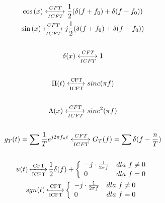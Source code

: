 \begin{multicols}{2}
        \begin{gather*}
            \cos{(x)} \xleftrightarrow[ICFT]{CFT} \frac{1}{2}(\delta(f+f_0) + \delta(f-f_0))\\
            \sin{(x)} \xleftrightarrow[ICFT]{CFT} j\frac{1}{2}(\delta(f+f_0) + \delta(f-f_0))\\\\
            \delta(x) \xleftrightarrow[ICFT]{CFT} 1\\\\
            \Pi(t) \xleftrightarrow[\text{ICFT}]{\text{CFT}} sinc(\pi f)\\\\
            \Lambda(x) \xleftrightarrow[ICFT]{CFT} sinc^2(\pi f)\\\\
            g_T(t) = \sum \frac{1}{T} e^{j2\pi f_n t} \xleftrightarrow[ICFT]{CFT} G_T(f) = \sum \delta(f-\frac{n}{T})\\\\
            u(t) \operatorname{\xleftrightarrow[\text{ICFT}]{\text{CFT}}} \frac{1}{2}\delta(f) + \left\{\begin{array}{l l}
                -j\cdot\frac{1}{2\pi f} & dla\ f\ne 0\\
                0 & dla\ f=0
            \end{array}\right.\\
            sgn(t) \operatorname{\xleftrightarrow[\text{ICFT}]{\text{CFT}}} \left\{\begin{array}{l l}
                -j\cdot\frac{1}{2\pi f} & dla\ f\ne0\\
                0 & dla\ f=0
            \end{array}\right.
        \end{gather*}
    \end{multicols}


